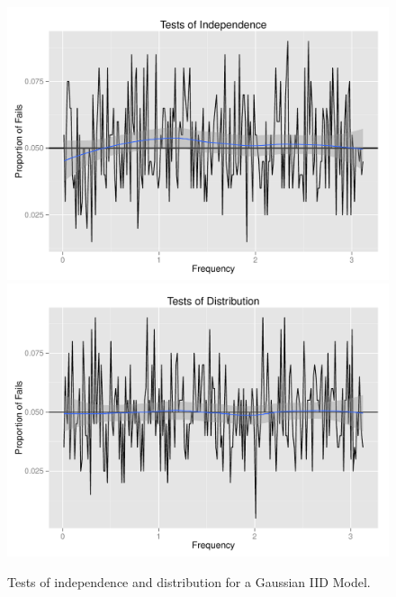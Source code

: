 \documentclass{article}\usepackage[]{graphicx}\usepackage[]{color}
\newenvironment{knitrout}{}{} %
\theoremstyle{plain}
\begin{document}
\begin{knitrout}
\color{fgcolor}\begin{figure}[H]

\includegraphics[width=.49\textwidth]{figure/tests-iid1} 
\includegraphics[width=.49\textwidth]{figure/tests-iid2} \caption[Tests of independence and distribution for a Gaussian IID Model]{Tests of independence and distribution for a Gaussian IID Model.\label{fig:tests-iid}}
\end{figure}


\end{knitrout}
\end{document}
